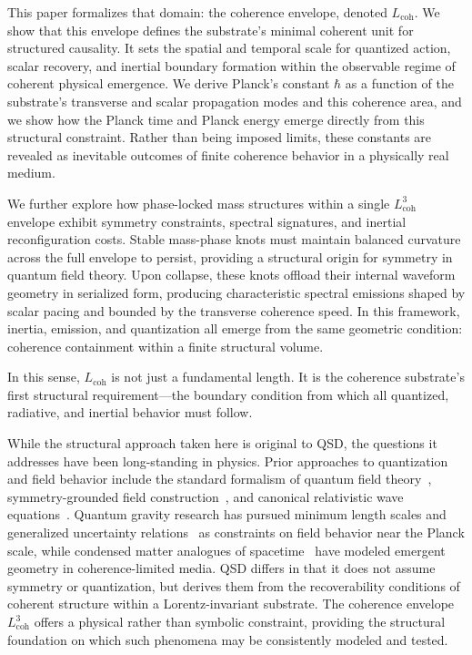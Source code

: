 \documentclass[entropy,article,submit,pdftex,moreauthors]{Definitions/mdpi}
\begin{document}
This paper formalizes that domain: the coherence envelope, denoted \texorpdfstring{\( L_{\text{coh}} \)}{Lcoh}. We show that this envelope defines the substrate’s minimal coherent unit for structured causality. It sets the spatial and temporal scale for quantized action, scalar recovery, and inertial boundary formation within the observable regime of coherent physical emergence. We derive Planck’s constant \texorpdfstring{\( \hbar \)}{hbar} as a function of the substrate’s transverse and scalar propagation modes and this coherence area, and we show how the Planck time and Planck energy emerge directly from this structural constraint. Rather than being imposed limits, these constants are revealed as inevitable outcomes of finite coherence behavior in a physically real medium.

We further explore how phase-locked mass structures within a single \texorpdfstring{\( L_{\text{coh}}^3 \)}{Lcoh\^{}3} envelope exhibit symmetry constraints, spectral signatures, and inertial reconfiguration costs. Stable mass-phase knots must maintain balanced curvature across the full envelope to persist, providing a structural origin for symmetry in quantum field theory. Upon collapse, these knots offload their internal waveform geometry in serialized form, producing characteristic spectral emissions shaped by scalar pacing and bounded by the transverse coherence speed. In this framework, inertia, emission, and quantization all emerge from the same geometric condition: coherence containment within a finite structural volume.

In this sense, \texorpdfstring{\( L_{\text{coh}} \)}{Lcoh} is not just a fundamental length. It is the coherence substrate’s first structural requirement---the boundary condition from which all quantized, radiative, and inertial behavior must follow.

While the structural approach taken here is original to QSD, the questions it addresses have been long-standing in physics. Prior approaches to quantization and field behavior include the standard formalism of quantum field theory~\cite{peskin1995}, symmetry-grounded field construction~\cite{weinberg1995}, and canonical relativistic wave equations~\cite{ryder1996}. Quantum gravity research has pursued minimum length scales and generalized uncertainty relations~\cite{amelino1994, garay1995} as constraints on field behavior near the Planck scale, while condensed matter analogues of spacetime~\cite{volovik2003, barcelo2005} have modeled emergent geometry in coherence-limited media. QSD differs in that it does not assume symmetry or quantization, but derives them from the recoverability conditions of coherent structure within a Lorentz-invariant substrate. The coherence envelope \( L_{\text{coh}}^3 \) offers a physical rather than symbolic constraint, providing the structural foundation on which such phenomena may be consistently modeled and tested.
\end{document}
